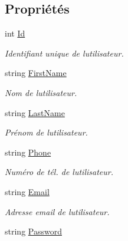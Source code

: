 \subsection*{Propriétés}
\begin{DoxyCompactItemize}
\item 
int \hyperlink{class_boxes_1_1_models_1_1_user_a9a98125abfd7776a45590823f984eda1}{Id}
\begin{DoxyCompactList}\small\item\em Identifiant unique de l\textquotesingle{}utilisateur. \end{DoxyCompactList}\item 
string \hyperlink{class_boxes_1_1_models_1_1_user_aa913f41f67791db983b4189c205c1cb9}{First\+Name}
\begin{DoxyCompactList}\small\item\em Nom de l\textquotesingle{}utilisateur. \end{DoxyCompactList}\item 
string \hyperlink{class_boxes_1_1_models_1_1_user_a550ef99bb25a182acb317bb3978c0d21}{Last\+Name}
\begin{DoxyCompactList}\small\item\em Prénom de l\textquotesingle{}utilisateur. \end{DoxyCompactList}\item 
string \hyperlink{class_boxes_1_1_models_1_1_user_af7e275b122f36fbc4324d80bdd508ce7}{Phone}
\begin{DoxyCompactList}\small\item\em Numéro de tél. de l\textquotesingle{}utilisateur. \end{DoxyCompactList}\item 
string \hyperlink{class_boxes_1_1_models_1_1_user_a6d827e7ad151b58c757ec61cdfb6bc1e}{Email}
\begin{DoxyCompactList}\small\item\em Adresse email de l\textquotesingle{}utilisateur. \end{DoxyCompactList}\item 
string \hyperlink{class_boxes_1_1_models_1_1_user_a449e3d795a2be241d73b26ad4eb43a2d}{Password}

\end{DoxyCompactItemize}
